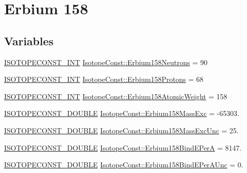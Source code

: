 \hypertarget{group___isotope_const-_erbium-_er158}{}\section{Erbium 158}
\label{group___isotope_const-_erbium-_er158}
\subsection*{Variables}
\begin{DoxyCompactItemize}
\item 
\mbox{\hyperlink{group___isotope_const-_macros_ga5f18360b3e99483a35c32d789e62621c}{I\+S\+O\+T\+O\+P\+E\+C\+O\+N\+S\+T\+\_\+\+I\+NT}} \mbox{\hyperlink{group___isotope_const-_erbium-_er158_gae25a0a5f07132a375a7ae91a2b6edc1a}{Isotope\+Const\+::\+Erbium158\+Neutrons}} = 90
\item 
\mbox{\hyperlink{group___isotope_const-_macros_ga5f18360b3e99483a35c32d789e62621c}{I\+S\+O\+T\+O\+P\+E\+C\+O\+N\+S\+T\+\_\+\+I\+NT}} \mbox{\hyperlink{group___isotope_const-_erbium-_er158_ga806bddbf9e82021ad124c402aa8804e8}{Isotope\+Const\+::\+Erbium158\+Protons}} = 68
\item 
\mbox{\hyperlink{group___isotope_const-_macros_ga5f18360b3e99483a35c32d789e62621c}{I\+S\+O\+T\+O\+P\+E\+C\+O\+N\+S\+T\+\_\+\+I\+NT}} \mbox{\hyperlink{group___isotope_const-_erbium-_er158_ga4a87da16bca9e0663a1360874d519e1c}{Isotope\+Const\+::\+Erbium158\+Atomic\+Weight}} = 158
\item 
\mbox{\hyperlink{group___isotope_const-_macros_ga8f45a7272ce02c0b4c65c44636ed719a}{I\+S\+O\+T\+O\+P\+E\+C\+O\+N\+S\+T\+\_\+\+D\+O\+U\+B\+LE}} \mbox{\hyperlink{group___isotope_const-_erbium-_er158_ga60a7378bb4e8f3b3cfd04b65c27bd95c}{Isotope\+Const\+::\+Erbium158\+Mass\+Exc}} = -\/65303.
\item 
\mbox{\hyperlink{group___isotope_const-_macros_ga8f45a7272ce02c0b4c65c44636ed719a}{I\+S\+O\+T\+O\+P\+E\+C\+O\+N\+S\+T\+\_\+\+D\+O\+U\+B\+LE}} \mbox{\hyperlink{group___isotope_const-_erbium-_er158_ga0d9028557e60ef91e77c4d10d47c8676}{Isotope\+Const\+::\+Erbium158\+Mass\+Exc\+Unc}} = 25.
\item 
\mbox{\hyperlink{group___isotope_const-_macros_ga8f45a7272ce02c0b4c65c44636ed719a}{I\+S\+O\+T\+O\+P\+E\+C\+O\+N\+S\+T\+\_\+\+D\+O\+U\+B\+LE}} \mbox{\hyperlink{group___isotope_const-_erbium-_er158_gab394959b7849cdc15e463e5cadc130a3}{Isotope\+Const\+::\+Erbium158\+Bind\+E\+PerA}} = 8147.
\item 
\mbox{\hyperlink{group___isotope_const-_macros_ga8f45a7272ce02c0b4c65c44636ed719a}{I\+S\+O\+T\+O\+P\+E\+C\+O\+N\+S\+T\+\_\+\+D\+O\+U\+B\+LE}} \mbox{\hyperlink{group___isotope_const-_erbium-_er158_gaa40c876cca58477f7f6d19250c928062}{Isotope\+Const\+::\+Erbium158\+Bind\+E\+Per\+A\+Unc}} = 0.

\end{DoxyCompactItemize}
